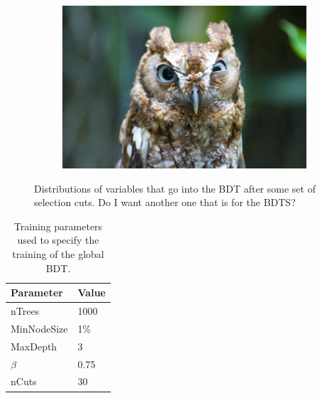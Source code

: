 \begin{figure}
    \begin{subfigure}[b]{0.4\textwidth}
        \includegraphics[width=\textwidth]{./Figs/placeholder.jpeg}
        \caption{ }
        \label{fig:}
    \end{subfigure}
    \caption{Distributions of variables that go into the BDT after some set of selection cuts. Do I want another one that is for the BDTS?}
    \label{fig:BDTvars}
\end{figure}


\begin{table}[htbp]
\begin{center}
\begin{tabular}{ll}
\hline
Parameter & Value \\ \hline
nTrees & 1000 \\
MinNodeSize & 1$\%$ \\
MaxDepth & 3 \\
$\beta$ & 0.75 \\
nCuts & 30 \\
\hline
\end{tabular}
\vspace{0.7cm}
\caption{Training parameters used to specify the training of the global BDT.}
\label{tab:BDTtrainingparams}
\end{center}
\end{table}



